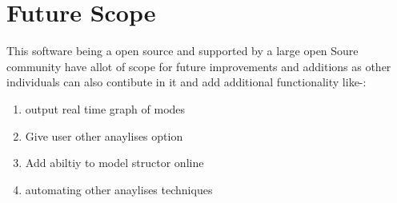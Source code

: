 \section{Future Scope}
This software being a open source and supported by a large open Soure community have allot of scope for future improvements
and additions as other individuals can also contibute in it and add additional functionality 
like-:
\begin{enumerate}
\item output real time graph of modes 
\item Give user other anaylises option 
\item Add abiltiy to model structor online
\item automating other anaylises techniques
\end{enumerate} 
